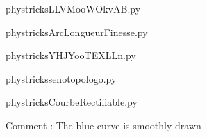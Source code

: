     

    \clearpage
    


    \newcommand{\CaptionFigLLVMooWOkvAB}{<+Type your caption here+>}
    \begin{center}
        
    \end{center}
    phystricksLLVMooWOkvAB.py

    

    \clearpage
    


    \newcommand{\CaptionFigArcLongueurFinesse}{<+Type your caption here+>}
    \begin{center}
        
    \end{center}
    phystricksArcLongueurFinesse.py

    

    \clearpage
    


    \newcommand{\CaptionFigYHJYooTEXLLn}{<+Type your caption here+>}
    \begin{center}
        
    \end{center}
    phystricksYHJYooTEXLLn.py

    

    \clearpage
    


    \newcommand{\CaptionFigsenotopologo}{<+Type your caption here+>}
    \begin{center}
        
    \end{center}
    phystrickssenotopologo.py

    

    \clearpage
    


    \newcommand{\CaptionFigCourbeRectifiable}{<+Type your caption here+>}
    \begin{center}
        
    \end{center}
    phystricksCourbeRectifiable.py

    Comment : The blue curve is smoothly drawn

